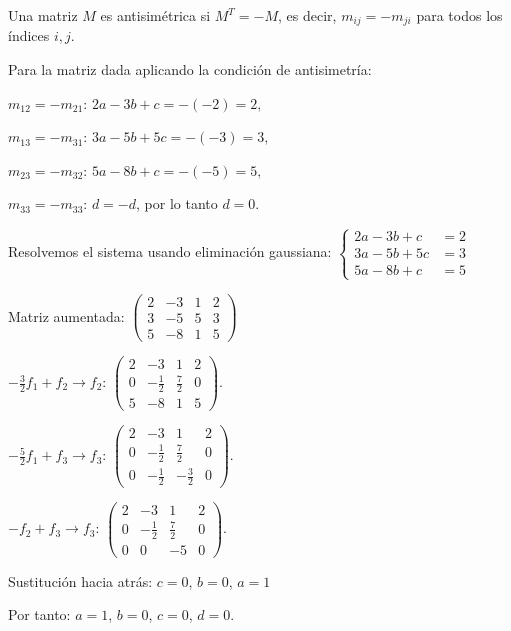 \begin{myproof}
Una matriz $M$ es antisimétrica si $M^T = -M$, es decir, $m_{ij} = -m_{ji}$ para todos los índices $i,j$.

Para la matriz dada aplicando la condición de antisimetría:

$m_{12} = -m_{21}$: $2a-3b+c = -(-2) = 2,$

$m_{13} = -m_{31}$: $3a-5b+5c = -(-3) = 3,$

$m_{23} = -m_{32}$: $5a-8b+c = -(-5) = 5,$

$m_{33} = -m_{33}$: $d = -d$, por lo tanto $d = 0$.

Resolvemos el sistema usando eliminación gaussiana: $\begin{cases}
2a-3b+c &= 2 \\
3a-5b+5c &= 3 \\
5a-8b+c &= 5 
\end{cases}$

Matriz aumentada: $\left(\begin{array}{ccc|c}
2 & -3 & 1 & 2 \\
3 & -5 & 5 & 3 \\
5 & -8 & 1 & 5
\end{array}\right)$

$-\frac{3}{2}f_1 + f_2 \to f_2$: $\left(\begin{array}{ccc|c}
2 & -3 & 1 & 2 \\
0 & -\frac{1}{2} & \frac{7}{2} & 0 \\
5 & -8 & 1 & 5
\end{array}\right).$

$-\frac{5}{2}f_1 + f_3 \to f_3$: $\left(\begin{array}{ccc|c}
2 & -3 & 1 & 2 \\
0 & -\frac{1}{2} & \frac{7}{2} & 0 \\
0 & -\frac{1}{2} & -\frac{3}{2} & 0
\end{array}\right).$

$-f_2 + f_3 \to f_3$: $\left(\begin{array}{ccc|c}
2 & -3 & 1 & 2 \\
0 & -\frac{1}{2} & \frac{7}{2} & 0 \\
0 & 0 & -5 & 0
\end{array}\right).$

Sustitución hacia atrás:
$c = 0$, $b = 0$, $a = 1$

Por tanto: $a = 1$, $b = 0$, $c = 0$, $d = 0$.
\end{myproof}

